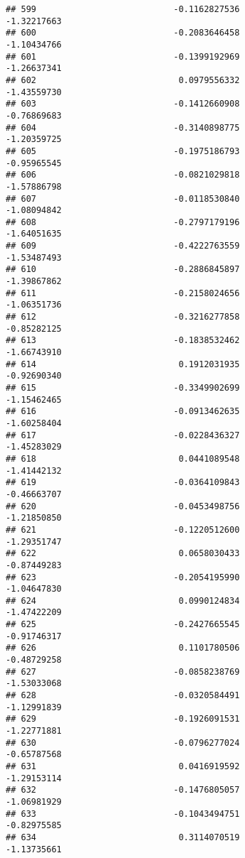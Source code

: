 \documentclass[
]{article}
\begin{document}
\begin{verbatim}
## 599                           -0.1162827536                -1.32217663
## 600                           -0.2083646458                -1.10434766
## 601                           -0.1399192969                -1.26637341
## 602                            0.0979556332                -1.43559730
## 603                           -0.1412660908                -0.76869683
## 604                           -0.3140898775                -1.20359725
## 605                           -0.1975186793                -0.95965545
## 606                           -0.0821029818                -1.57886798
## 607                           -0.0118530840                -1.08094842
## 608                           -0.2797179196                -1.64051635
## 609                           -0.4222763559                -1.53487493
## 610                           -0.2886845897                -1.39867862
## 611                           -0.2158024656                -1.06351736
## 612                           -0.3216277858                -0.85282125
## 613                           -0.1838532462                -1.66743910
## 614                            0.1912031935                -0.92690340
## 615                           -0.3349902699                -1.15462465
## 616                           -0.0913462635                -1.60258404
## 617                           -0.0228436327                -1.45283029
## 618                            0.0441089548                -1.41442132
## 619                           -0.0364109843                -0.46663707
## 620                           -0.0453498756                -1.21850850
## 621                           -0.1220512600                -1.29351747
## 622                            0.0658030433                -0.87449283
## 623                           -0.2054195990                -1.04647830
## 624                            0.0990124834                -1.47422209
## 625                           -0.2427665545                -0.91746317
## 626                            0.1101780506                -0.48729258
## 627                           -0.0858238769                -1.53033068
## 628                           -0.0320584491                -1.12991839
## 629                           -0.1926091531                -1.22771881
## 630                           -0.0796277024                -0.65787568
## 631                            0.0416919592                -1.29153114
## 632                           -0.1476805057                -1.06981929
## 633                           -0.1043494751                -0.82975585
## 634                            0.3114070519                -1.13735661

\end{verbatim}
\end{document}
